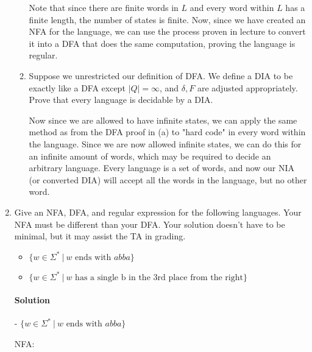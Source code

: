 \documentclass[11pt]{article}
\newcommand{\solution}[1]{\paragraph{Solution}  }
\begin{document}
\begin{enumerate}
\begin{enumerate}
            Note that since there are finite words in $L$ and every word within $L$ has a finite length, the number of states is finite. Now, since we have created an NFA for the language, we can use the process proven in lecture to convert it into a DFA that does the same computation, proving the language is regular. 
            
        \item Suppose we unrestricted our definition of DFA. We define a DIA to be exactly like a DFA except $|Q|=\infty$, and $\delta, F$ are adjusted appropriately. Prove that every language is decidable by a DIA.

            Now since we are allowed to have infinite states, we can apply the same method as from the DFA proof in (a) to "hard code" in every word within the language. Since we are now allowed infinite states, we can do this for an infinite amount of words, which may be required to decide an arbitrary language. Every language is a set of words, and now our NIA (or converted DIA) will accept all the words in the language, but no other word.
    
    \end{enumerate}
    
    \item Give an NFA, DFA, and regular expression for the following languages. Your NFA must be different than your DFA. Your solution doesn't have to be minimal, but it may assist the TA in grading. 
    \begin{itemize}
        \item $\{w \in \Sigma^* ~|~ w\text{ ends with } abba\}$
        \item $\{w \in \Sigma^* ~|~ w\text{ has a single b in the 3rd place from the right}\}$
    \end{itemize}

    \solution{} -
    \newline \newline
    $\{w \in \Sigma^* ~|~ w\text{ ends with } abba\}$

    NFA:
    \begin{figure}[ht]
        \centering
\end{figure}
\end{enumerate}
\end{document}
